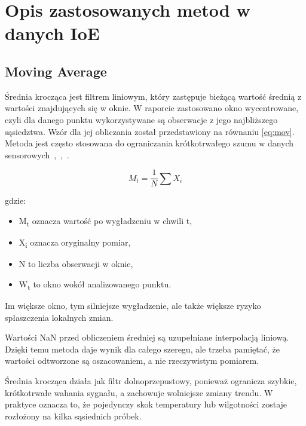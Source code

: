 \documentclass[12pt,twoside]{article}
\begin{document}
\section{Opis zastosowanych metod w danych IoE}

\subsection{Moving Average}


Średnia krocząca jest filtrem liniowym, który
zastępuje bieżącą wartość średnią z wartości znajdujących
się w oknie. W raporcie zastosowano okno wycentrowane, czyli dla
danego punktu wykorzystywane są obserwacje z jego najbliższego
sąsiedztwa. 
Wzór dla jej obliczania został przedstawiony na równaniu \ref{eq:mov}.
Metoda jest często stosowana do ograniczania
krótkotrwałego szumu w danych sensorowych~\cite{bib:ioe1},~\cite{bib:ioe4},~\cite{bib:ioe5}.


\begin{equation}
\label{eq:mov}
M_t = \frac{1}{N} \sum X_i
\end{equation}


gdzie:


\begin{itemize}

	\item M\textsubscript{t}
	oznacza wartość po wygładzeniu w chwili t,



	\item X\textsubscript{i}
	oznacza oryginalny pomiar,



	\item N to liczba obserwacji w oknie,



	\item W\textsubscript{t}
	to okno wokół analizowanego punktu.



\end{itemize}

Im większe okno, tym
silniejsze wygładzenie, ale także większe ryzyko spłaszczenia
lokalnych zmian.


Wartości NaN przed obliczeniem
średniej są uzupełniane interpolacją liniową. Dzięki temu
metoda daje wynik dla całego szeregu, ale trzeba pamiętać, że
wartości odtworzone są oszacowaniem, a nie rzeczywistym pomiarem.


Średnia krocząca działa jak
filtr dolnoprzepustowy, ponieważ ogranicza szybkie, krótkotrwałe
wahania sygnału, a zachowuje wolniejsze zmiany trendu. W praktyce
oznacza to, że pojedynczy skok temperatury lub wilgotności zostaje
rozłożony na kilka sąsiednich próbek.
\end{document}
